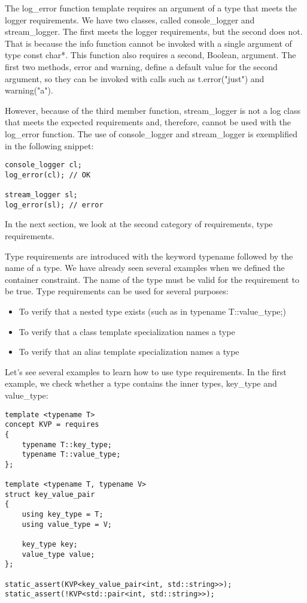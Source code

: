 The log\_error function template requires an argument of a type that meets the logger requirements. We have two classes, called console\_logger and stream\_logger. The first meets the logger requirements, but the second does not. That is because the info function cannot be invoked with a single argument of type const char*. This function also requires a second, Boolean, argument. The first two methods, error and warning, define a default value for the second argument, so they can be invoked with calls such as t.error("just") and warning("a").

However, because of the third member function, stream\_logger is not a log class that meets the expected requirements and, therefore, cannot be used with the log\_error function. The use of console\_logger and stream\_logger is exemplified in the following snippet:

\begin{lstlisting}[style=styleCXX]
console_logger cl;
log_error(cl); // OK

stream_logger sl;
log_error(sl); // error
\end{lstlisting}

In the next section, we look at the second category of requirements, type requirements.


Type requirements are introduced with the keyword typename followed by the name of a type. We have already seen several examples when we defined the container constraint. The name of the type must be valid for the requirement to be true. Type requirements can be used for several purposes:

\begin{itemize}
\item
To verify that a nested type exists (such as in typename T::value\_type;)

\item
To verify that a class template specialization names a type

\item
To verify that an alias template specialization names a type
\end{itemize}

Let’s see several examples to learn how to use type requirements. In the first example, we check whether a type contains the inner types, key\_type and value\_type:

\begin{lstlisting}[style=styleCXX]
template <typename T>
concept KVP = requires
{
	typename T::key_type;
	typename T::value_type;
};

template <typename T, typename V>
struct key_value_pair
{
	using key_type = T;
	using value_type = V;
	
	key_type key;
	value_type value;
};

static_assert(KVP<key_value_pair<int, std::string>>);
static_assert(!KVP<std::pair<int, std::string>>);
\end{lstlisting}

